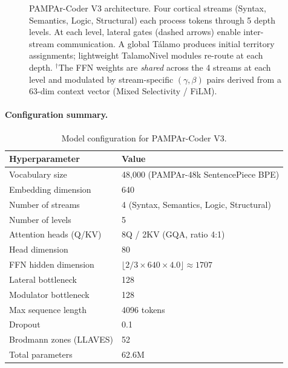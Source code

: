 \documentclass[11pt,a4paper]{article}
\begin{document}
\begin{figure}[t]
\caption{PAMPAr-Coder V3 architecture.  Four cortical streams (Syntax,
Semantics, Logic, Structural) each process tokens through 5 depth levels.
At each level, lateral gates (dashed arrows) enable inter-stream communication.
A global Tálamo produces initial territory assignments; lightweight
TalamoNivel modules re-route at each depth.  ${}^\dagger$The FFN weights
are \emph{shared} across the 4 streams at each level and modulated by
stream-specific $(\gamma, \beta)$ pairs derived from a 63-dim context vector
(Mixed Selectivity / FiLM).}
\label{fig:architecture}
\end{figure}

\paragraph{Configuration summary.}

\begin{table}[h]
\centering
\small
\begin{tabular}{ll}
\toprule
\textbf{Hyperparameter} & \textbf{Value} \\
\midrule
Vocabulary size        & 48,000 (PAMPAr-48k SentencePiece BPE) \\
Embedding dimension    & 640 \\
Number of streams      & 4 (Syntax, Semantics, Logic, Structural) \\
Number of levels       & 5 \\
Attention heads (Q/KV) & 8Q / 2KV (GQA, ratio 4:1) \\
Head dimension         & 80 \\
FFN hidden dimension   & $\lfloor 2/3 \times 640 \times 4.0 \rfloor \approx 1707$ \\
Lateral bottleneck     & 128 \\
Modulator bottleneck   & 128 \\
Max sequence length    & 4096 tokens \\
Dropout                & 0.1 \\
Brodmann zones (LLAVES)& 52 \\
Total parameters       & 62.6M \\
\bottomrule
\end{tabular}
\caption{Model configuration for PAMPAr-Coder V3.}
\label{tab:config}
\end{table}
\end{document}
